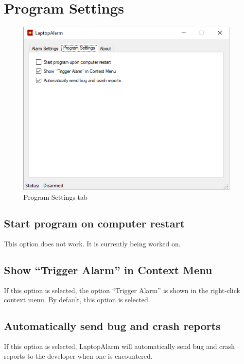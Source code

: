 \documentclass[12pt, letterpaper]{article}
\begin{document}
\section{Program Settings}

\begin{figure}[H]
  \caption{Program Settings tab}
  \centering
    \includegraphics{figures/figure07.png}
\end{figure}

\subsection{Start program on computer restart}
This option does not work. It is currently being worked on.

\subsection{Show ``Trigger Alarm'' in Context Menu}
If this option is selected, the option ``Trigger Alarm'' is shown in the right-click context menu.
By default, this option is selected.

\subsection{Automatically send bug and crash reports}
If this option is selected, LaptopAlarm will automatically send bug and crash reports to the developer when one is encountered.
\end{document}
